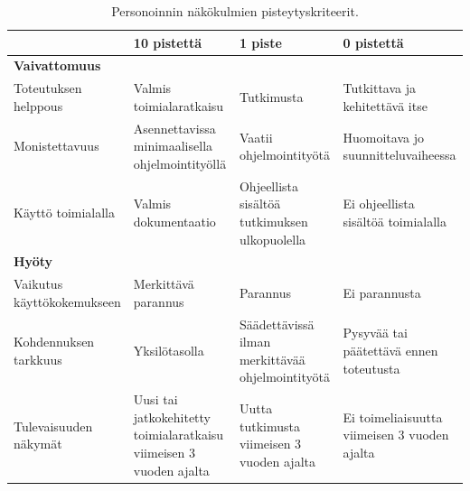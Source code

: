 \documentclass[finnish, 12pt, a4paper, elec, utf8, a-1b]{aaltothesis}
\begin{document}
{\tiny\tabcolsep=3pt
\begin{longtable}{p{4cm}|p{3cm}|p{3cm}|p{3cm}}
    \caption{Personoinnin näkökulmien pisteytyskriteerit.\label{table:personalization-comparison-criteria}}                                                                                           \\
                               & 10 pistettä                                                        & 1 piste                                          & 0 pistettä                                   \\
    \midrule
    \textbf{Vaivattomuus}                                                                                                                                                                             \\
    \midrule
    Toteutuksen helppous       & Valmis toimialaratkaisu                                            & Tutkimusta                                       & Tutkittava ja kehitettävä itse               \\
    \midrule
    Monistettavuus             & Asennettavissa minimaalisella ohjelmointityöllä                    & Vaatii ohjelmointityötä                          & Huomoitava jo suunnitteluvaiheessa           \\
    \midrule
    Käyttö toimialalla         & Valmis dokumentaatio                                               & Ohjeellista sisältöä tutkimuksen ulkopuolella    & Ei ohjeellista sisältöä toimialalla          \\
    \midrule
    \textbf{Hyöty}                                                                                                                                                                                    \\
    \midrule
    Vaikutus käyttökokemukseen & Merkittävä parannus                                                & Parannus                                         & Ei parannusta                                \\
    \midrule
    Kohdennuksen tarkkuus      & Yksilötasolla                                                      & Säädettävissä ilman merkittävää ohjelmointityötä & Pysyvää tai päätettävä ennen toteutusta      \\
    \midrule
    Tulevaisuuden näkymät      & Uusi tai jatkokehitetty toimialaratkaisu viimeisen 3 vuoden ajalta & Uutta tutkimusta viimeisen 3 vuoden ajalta       & Ei toimeliaisuutta viimeisen 3 vuoden ajalta \\
\end{longtable}
}
\end{document}
